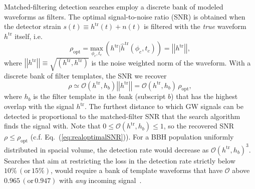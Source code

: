 \documentclass[aps,
prd,
twocolumn,
superscriptaddress,
lengthcheck,showpacs,letterpaper,nofootinbib,
floatfix]{revtex4-1}
\newcommand{\tr}{\mathrm{tr}}
\newcommand{\leftn}{\left|\left|}
\newcommand{\rightn}{\right|\right|}
\newcommand{\Olap}{\mathcal{O}}
\def\l({\left(}
\def\r){\right)}
\begin{document}
Matched-filtering detection searches employ a discrete bank of modeled
waveforms as filters. The optimal signal-to-noise ratio (SNR) is obtained when
the detector strain $s(t)\equiv h^{\tr}(t) + n(t)$ is filtered with the 
\textit{true} waveform $h^{\tr}$ itself, i.e.
\begin{equation}
 \rho_{\mathrm{opt}} = \underset{\phi_c,t_c}{\mathrm{max}}\,\l(h^{\tr}|\hat{h}^{\tr}(\phi_c,t_c)\r) = \leftn h^{\tr}\rightn,
\end{equation}
where $\leftn h^{\tr}\rightn\equiv\sqrt{\left(h^{\tr},h^{\tr}\right)}$ is the
noise weighted norm of the waveform. With a discrete bank of filter templates, 
the SNR we recover
\begin{equation}\label{eq:realoptimalSNR}
 \rho\simeq \Olap(h^{\tr},h_b)\leftn h^{\tr}\rightn = \Olap(h^{\tr},h_b)\,\rho_{\mathrm{opt}},
\end{equation}
where $h_b$ is the filter template in the $b$ank (subscript $b$) that has the
highest overlap with the signal $h^{\tr}$.
The furthest distance to which GW signals can be detected is proportional to 
the matched-filter SNR that the search algorithm finds the signal with. 
Note that $0\leq\Olap(h^{\tr},h_b)\leq 1$, so the recovered SNR
$\rho\leq \rho_{\mathrm{opt}}$ (c.f. Eq.~(\ref{eq:realoptimalSNR})). 
For a BBH population uniformly distributed in spacial volume, the 
detection rate would decrease as $\Olap(h^{\tr},h_b)^3$. Searches that aim at
restricting the loss in the detection rate strictly below 
$10\%\,(\mathrm{or}\, 15\%)$, would require a bank of template waveforms that
have $\Olap$ above $0.965\,(\mathrm{or}\, 0.947)$ with \textit{any} incoming
signal~\citep{WaveformAccuracy2008,WaveformAccuracy2010}.
\end{document}
